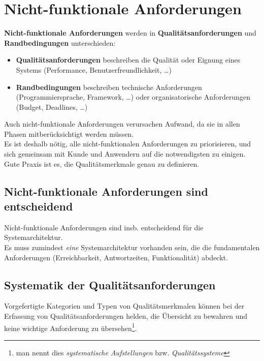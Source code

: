\section{Nicht-funktionale Anforderungen}\label{sec:nicht-funktionale-anforderungen}

\noindent
\textbf{Nicht-funktionale Anforderungen} werden in \textbf{Qualitätsanforderungen} und \textbf{Randbedingungen} unterschieden:

\begin{itemize}
    \item \textbf{Qualitätsanforderungen} beschreiben die Qualität oder Eignung eines Systems (Performance, Benutzerfreundlichkeit, \ldots)
    \item \textbf{Randbedingungen} beschreiben technische Anforderungen (Programmiersprache, Framework, \ldots) oder organisatorische Anforderungen (Budget, Deadlines, \ldots)
\end{itemize}

\noindent
Auch nicht-funktionale Anforderungen verursachen Aufwand, da sie in allen Phasen mitberücksichtigt werden müssen.\\
Es ist deshalb nötig, alle nicht-funktionalen Anforderungen zu priorisieren, und sich gemeinsam mit Kunde und Anwendern auf die notwendigsten zu einigen.\\
Gute Praxis ist es, die Qualitätsmerkmale genau zu definieren.

\subsection*{Nicht-funktionale Anforderungen sind entscheidend}
Nicht-funktionale Anforderungen sind insb. entscheidend für die Systemarchitektur.\\
Es muss zumindest \textit{eine} Systemarchitektur vorhanden sein, die die fundamentalen Anforderungen (Erreichbarkeit, Antwortzeiten, Funktionalität) abdeckt.

\subsection*{Systematik der Qualitätsanforderungen}
Vorgefertigte Kategorien und Typen von Qualitätsmerkmalen können bei der Erfassung von Qualitätsanforderungen helden, die Übersicht zu bewahren und keine wichtige Anforderung zu übersehen\footnote{man nennt dies \textit{systematische Aufstellungen} bzw. \textit{Qualitätssysteme}}.\\

